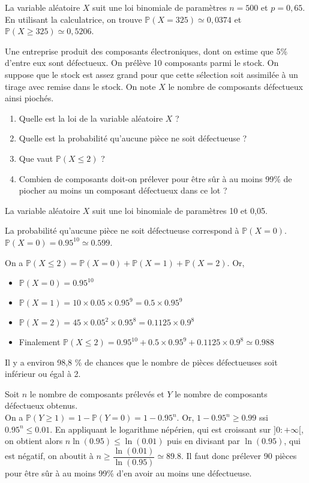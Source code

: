 \documentclass[11pt,fleqn, openany]{book} %
\begin{document}
\begin{solution}La variable aléatoire $X$ suit une loi binomiale de paramètres $n=500$ et $p=0,65$. En utilisant la calculatrice, on trouve $\mathbb{P}(X=325) \simeq 0,0374$ et $\mathbb{P}(X \geqslant 325)\simeq 0,5206$.\end{solution}

\begin{exercise}[topic=prob12]

Une entreprise produit des composants électroniques, dont on estime que 5\% d'entre eux sont défectueux. On prélève 10 composants parmi le stock. On suppose que le stock est assez grand pour que cette sélection soit assimilée à un tirage avec remise dans le stock. On note $X$ le nombre de composants défectueux ainsi piochés.

\begin{enumerate}
\item Quelle est la loi de la variable aléatoire $X$ ?
\item Quelle est la probabilité qu'aucune pièce ne soit défectueuse ?
\item Que vaut $\mathbb{P}(X \leqslant 2)$ ? 
\item Combien de composants doit-on prélever pour être sûr à au moins 99\% de piocher au moins un composant défectueux dans ce lot ?
\end{enumerate}\end{exercise}

\begin{solution}
La variable aléatoire $X$ suit une loi binomiale de paramètres 10 et 0,05.

La probabilité qu'aucune pièce ne soit défectueuse correspond à $\mathbb{P}(X=0)$. $\mathbb{P}(X=0)= 0.95^{10} \simeq 0.599$.

On a $\mathbb{P}(X \leqslant 2) = \mathbb{P}(X =0) + \mathbb{P}(X=1)  + \mathbb{P}(X=2)$. Or,
\begin{itemize}
\item $\mathbb{P}(X=0)=0.95^{10}$
\item $\mathbb{P}(X=1)=10 \times 0.05 \times 0.95 ^9 = 0.5 \times 0.95 ^9$
\item $\mathbb{P}(X=2)= 45 \times 0.05^2 \times 0.95^8 = 0.1125 \times 0.9^8$
\item Finalement $\mathbb{P}(X \leqslant 2)= 0.95^{10}+0.5 \times 0.95^9 + 0.1125 \times 0.9^8 \simeq 0.988$
\end{itemize} Il y a environ 98,8 \% de chances que le nombre de pièces défectueuses soit inférieur ou égal à 2.

Soit $n$ le nombre de composants prélevés et $Y$ le nombre de composants défectueux obtenus. \\On a $\mathbb{P}(Y\geqslant 1)=1-\mathbb{P}(Y=0)=1-0.95^n$. Or, $1-0.95^n \geqslant 0.99$ ssi $0.95^n \leqslant 0.01$. En appliquant le logarithme népérien, qui est croissant sur $]0:+\infty[$, on obtient alors $n \ln(0.95) \leqslant \ln(0.01)$ puis en divisant par $\ln(0.95)$, qui est négatif, on aboutit à $n \geqslant \dfrac{\ln(0.01)}{\ln(0.95)}\simeq 89.8$. Il faut donc prélever 90 pièces pour être sûr à au moins 99\% d'en avoir au moins une défectueuse.
\end{solution}
\end{document}
